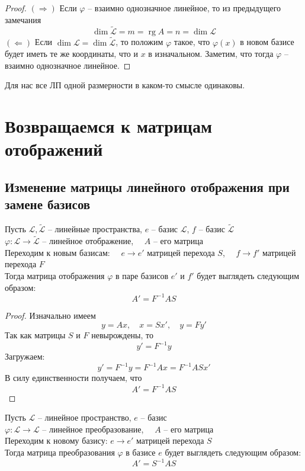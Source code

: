 \documentclass[11pt]{article}
\DeclareMathOperator{\rg}{rg}
\begin{document}
\begin{proof}
  $(\Longrightarrow)$ Если $\varphi$ -- взаимно однозначное линейное, то из предыдущего замечания 
  \[\dim \widetilde{\mathcal{L}} = m = \rg A = n = \dim \mathcal{L}\]
  $(\Longleftarrow)$ Если $\dim \mathcal{L} = \dim \widetilde{\mathcal{L}}$, то положим $\varphi$ такое, что $\varphi (x)$ 
  в новом базисе будет иметь те же координаты, что и $x$ в изначальном. Заметим, что тогда $\varphi$ -- взаимно однозначное линейное.
\end{proof}

\begin{remark}
  Для нас все ЛП одной размерности в каком-то смысле одинаковы.
\end{remark}

\section{Возвращаемся к матрицам отображений}

\subsection{Изменение матрицы линейного отображения при замене базисов}

\begin{lemma}
  Пусть $\mathcal{L}, \widetilde{\mathcal{L}}$ -- линейные пространства, $e$ -- базис $\mathcal{L}$, $f$ -- базис $\widetilde{\mathcal{L}}$ \\
  $\varphi \colon \mathcal{L} \to \widetilde{\mathcal{L}}$ -- линейное отображение, $\quad A$ -- его матрица \\
  Переходим к новым базисам: $\quad e \to e'$ матрицей перехода $S$, $\quad f \to f'$ матрицей перехода $F$ \\
  Тогда матрица отображения $\varphi$ в паре базисов $e'$ и $f'$ будет выглядеть следующим образом: 
  \[A' = F^{-1}AS\]
\end{lemma}

\begin{proof}
  Изначально имеем \[y = Ax, \quad x = Sx', \quad y = Fy'\]
  Так как матрицы $S$ и $F$ невырождены, то \[y' = F^{-1}y\]
  Загружаем: \[y' = F^{-1}y = F^{-1}Ax = F^{-1}ASx'\]
  В силу единственности получаем, что \[A' = F^{-1}AS\]
\end{proof}

\begin{lemma}
  Пусть $\mathcal{L}$ -- линейное пространство, $e$ -- базис \\
  $\varphi \colon \mathcal{L} \to \mathcal{L}$ -- линейное преобразование, $\quad A$ -- его матрица \\
  Переходим к новому базису: $e \to e'$ матрицей перехода $S$ \\
  Тогда матрица преобразования $\varphi$ в базисе $e$ будет выглядеть следующим образом: 
  \[A' = S^{-1}AS\]
\end{lemma}
\end{document}
